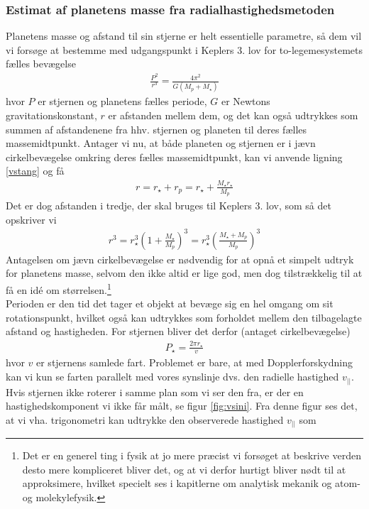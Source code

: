 \subsubsection{Estimat af planetens masse fra radialhastighedsmetoden}
Planetens masse og afstand til sin stjerne er helt essentielle parametre, så dem vil vi forsøge at bestemme med udgangspunkt i Keplers 3. lov for to-legemesystemets fælles bevægelse
\begin{align} \label{kepler3lov}
    \frac{P^2}{r^3} = \frac{4\pi^2}{G(M_p+M_\star )}
\end{align}
hvor $P$ er stjernen og planetens fælles periode, $G$ er Newtons gravitationskonstant, $r$ er afstanden mellem dem, og det kan også udtrykkes som summen af afstandenene fra hhv. stjernen og planeten til deres fælles massemidtpunkt. Antager vi nu, at både planeten og stjernen er i jævn cirkelbevægelse omkring deres fælles massemidtpunkt, kan vi anvende ligning \ref{vstang} og få
\begin{align}
    r = r_\star+r_p  = r_\star  + \frac{M_\star r_\star }{M_p}
\end{align}
Det er dog afstanden i tredje, der skal bruges til Keplers 3. lov, som så det opskriver vi
\begin{align} \label{rvstang}
    r^3 = r_\star ^3\left(1 + \frac{M_\star }{M_p}\right)^3 = r_\star ^3\left(\frac{M_\star  + M_p}{M_p}\right)^3
\end{align}
Antagelsen om jævn cirkelbevægelse er nødvendig for at opnå et simpelt udtryk for planetens masse, selvom den ikke altid er lige god, men dog tilstrækkelig til at få en idé om størrelsen.\footnote{Det er en generel ting i fysik at jo mere præcist vi forsøget at beskrive verden desto mere kompliceret bliver det, og at vi derfor hurtigt bliver nødt til at approksimere, hvilket specielt ses i kapitlerne om analytisk mekanik og atom- og molekylefysik.} \\
Perioden er den tid det tager et objekt at bevæge sig en hel omgang om sit rotationspunkt, hvilket også kan udtrykkes som forholdet mellem den tilbagelagte afstand og hastigheden. For stjernen bliver det derfor (antaget cirkelbevægelse)
\begin{align}
    P_\star  = \frac{2\pi r_\star }{v} \label{Pstar}
\end{align}
hvor $v$ er stjernens samlede fart. Problemet er bare, at med Dopplerforskydning kan vi kun se farten parallelt med vores synslinje dvs. den radielle hastighed $v_{||}$. Hvis stjernen ikke roterer i samme plan som vi ser den fra, er der en hastighedskomponent vi ikke får målt, se figur \ref{fig:vsini}. Fra denne figur ses det, at vi vha. trigonometri kan udtrykke den observerede hastighed $v_{||}$ som


